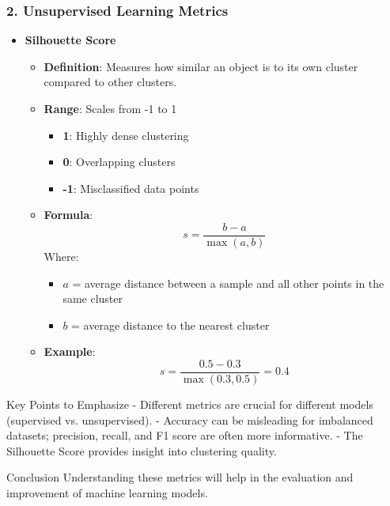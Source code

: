 \documentclass[aspectratio=169]{beamer}
\begin{document}
\begin{frame}[fragile]
    \frametitle{2. Unsupervised Learning Metrics}
    
    \begin{itemize}
        \item \textbf{Silhouette Score}
            \begin{itemize}
                \item \textbf{Definition}: Measures how similar an object is to its own cluster compared to other clusters.
                \item \textbf{Range}: Scales from -1 to 1 
                    \begin{itemize}
                        \item \textbf{1}: Highly dense clustering
                        \item \textbf{0}: Overlapping clusters
                        \item \textbf{-1}: Misclassified data points
                    \end{itemize}
                \item \textbf{Formula}:
                \begin{equation}
                s = \frac{b - a}{\max(a, b)}
                \end{equation}
                Where:
                \begin{itemize}
                    \item \( a \) = average distance between a sample and all other points in the same cluster 
                    \item \( b \) = average distance to the nearest cluster
                \end{itemize}
                
                \item \textbf{Example}:
                \begin{equation}
                s = \frac{0.5 - 0.3}{\max(0.3, 0.5)} = 0.4
                \end{equation}
            \end{itemize}
    \end{itemize}
    
    \begin{block}{Key Points to Emphasize}
        - Different metrics are crucial for different models (supervised vs. unsupervised).
        - Accuracy can be misleading for imbalanced datasets; precision, recall, and F1 score are often more informative.
        - The Silhouette Score provides insight into clustering quality.
    \end{block}
    
    \begin{block}{Conclusion}
        Understanding these metrics will help in the evaluation and improvement of machine learning models.
    \end{block}
\end{frame}
\end{document}
